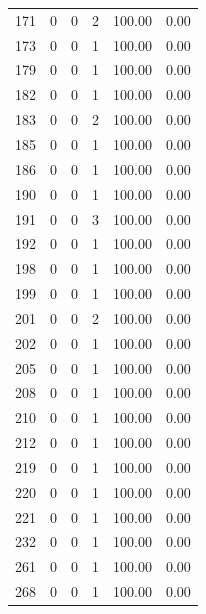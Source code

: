 \documentclass[11pt]{article}
\begin{document}
\begin{longtable}{r|r|r|r|r|r}
    171   & 0     & 0     & 2     & 100.00 & 0.00 \\
    173   & 0     & 0     & 1     & 100.00 & 0.00 \\
    179   & 0     & 0     & 1     & 100.00 & 0.00 \\
    182   & 0     & 0     & 1     & 100.00 & 0.00 \\
    183   & 0     & 0     & 2     & 100.00 & 0.00 \\
    185   & 0     & 0     & 1     & 100.00 & 0.00 \\
    186   & 0     & 0     & 1     & 100.00 & 0.00 \\
    190   & 0     & 0     & 1     & 100.00 & 0.00 \\
    191   & 0     & 0     & 3     & 100.00 & 0.00 \\
    192   & 0     & 0     & 1     & 100.00 & 0.00 \\
    198   & 0     & 0     & 1     & 100.00 & 0.00 \\
    199   & 0     & 0     & 1     & 100.00 & 0.00 \\
    201   & 0     & 0     & 2     & 100.00 & 0.00 \\
    202   & 0     & 0     & 1     & 100.00 & 0.00 \\
    205   & 0     & 0     & 1     & 100.00 & 0.00 \\
    208   & 0     & 0     & 1     & 100.00 & 0.00 \\
    210   & 0     & 0     & 1     & 100.00 & 0.00 \\
    212   & 0     & 0     & 1     & 100.00 & 0.00 \\
    219   & 0     & 0     & 1     & 100.00 & 0.00 \\
    220   & 0     & 0     & 1     & 100.00 & 0.00 \\
    221   & 0     & 0     & 1     & 100.00 & 0.00 \\
    232   & 0     & 0     & 1     & 100.00 & 0.00 \\
    261   & 0     & 0     & 1     & 100.00 & 0.00 \\
    268   & 0     & 0     & 1     & 100.00 & 0.00 \\
    \bottomrule
\end{longtable} 
\end{document}

